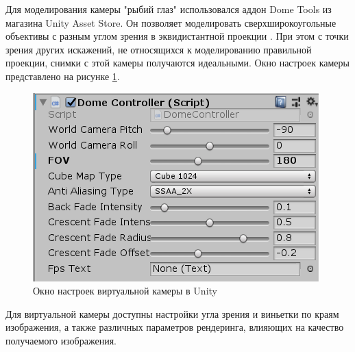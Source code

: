 Для моделирования камеры "рыбий глаз" использовался аддон Dome Tools из магазина Unity Asset Store.    %
Он позволяет моделировать сверхширокоугольные объективы с разным углом зрения в эквидистантной проекции \cite{}. %
При этом с точки зрения других искажений, не относящихся к моделированию правильной проекции, снимки с этой камеры получаются идеальными. %
Окно настроек камеры представлено на рисунке \ref{pic:camera_settings}.
\begin{figure}[H]
    \begin{center}
        \includegraphics[scale=0.5]{pics/camera_settings.png}                                                                                            %
        \caption{Окно настроек виртуальной камеры в Unity}
        \label{pic:camera_settings}
    \end{center}
\end{figure}
Для виртуальной камеры доступны настройки угла зрения и виньетки по краям изображения,  %
а также различных параметров рендеринга, влияющих на качество получаемого изображения. 